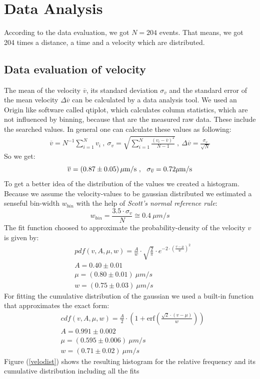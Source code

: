 \section{Data Analysis}

    According to the data evaluation, we got $N = 204$ events. That means, we got 204 times a distance, a time and a velocity which are distributed. 
    \subsection{Data evaluation of velocity}
        The mean of the velocity $\overline v$, its standard deviation $\sigma_{\overline v}$ and the standard error of the mean velocity $\Delta \overline v$ can be calculated by a data analysis tool. We used an Origin like software called qtiplot, which calculates column statistics, which are not influenced by binning, because that are the measured raw data. These include the searched values.
        In general one can calculate these values as following:
        \begin{eqnarray*}
            \overline v = N^{-1} \sum_{i = 1}^{N}v_i\ ,\ \sigma_{v} = \sqrt{\sum_{i = 1}^{N} \frac{(v_i - \overline v)^2}{N-1}}\ , \ \Delta \overline v = \frac{\sigma_{v}}{\sqrt{N}}
        \end{eqnarray*}
        So we get:
        $$ \overline v = \unit[(0.87 \pm 0.05)]{\mu m/s}\ , \ \ \sigma_{\overline v} = 0.72 \unit{\mu m/s}$$
        To get a better idea of the distribution of the values we created a histogram. Because we assume the velocity-values to be gaussian distributed we estimated a senseful bin-width $w_{bin}$ with the help of \textit{Scott's normal reference rule}\cite{wikiHisto}:
	    $$ w_{bin} = \frac{3.5 \cdot \sigma_v}{N} \cong 0.4\ \unit{\mu m/s}$$
	    The fit function choosed to approximate the probability-density of the velocity $v$ is given by:
	    \begin{align*}
	    		&pdf(v,A,\mu, w) = \frac{A}{w}\cdot \sqrt{\frac{2}{\pi}}\cdot e^{-2\cdot\left(\frac{v-\mu}{w}\right)^2}\\
	    		&A = 0.40\pm 0.01\\
	    		&\mu = (0.80 \pm 0.01)\ \unit{\mu m/s}\\
	    		&w = (0.75 \pm 0.03)\ \unit{\mu m/s}
	    \end{align*}
	    For fitting the cumulative distribution of the gaussian we used a built-in function that approximates the exact form:
	    \begin{align*}
		    &cdf(v,A,\mu,w) =\frac{A}{2}\cdot\left(1+\mathrm{erf}\left(\frac{\sqrt{2}\cdot(v-\mu)}{w}\right)\right)\\
		    &A = 0.991 \pm 0.002\\
		    &\mu = (0.595 \pm 0.006)\ \unit{\mu m/s}\\
		    &w = (0.71 \pm 0.02)\ \unit{\mu m/s}
	    \end{align*} 
	    Figure (\ref{velodist}) shows the resulting histogram for the relative frequency and its cumulative distribution including all the fits
        
